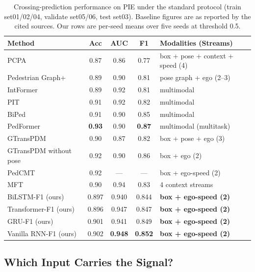 \documentclass[mti,article,submit,moreauthors]{Definitions/mdpi}
\begin{document}
\begin{table}[H]
\caption{Crossing-prediction performance on PIE under the standard protocol (train set01/02/04, validate set05/06, test set03). Baseline figures are as reported by the cited sources. Our rows are per-seed means over five seeds at threshold 0.5.\label{tab:baselines}}
\begin{tabularx}{\textwidth}{lcccX}
\toprule
\textbf{Method} & \textbf{Acc} & \textbf{AUC} & \textbf{F1} & \textbf{Modalities (Streams)}\\
\midrule
PCPA~\citep{kotseruba2021benchmark} & 0.87 & 0.86 & 0.77 & box + pose + context + speed (4)\\
Pedestrian Graph+~\citep{cadena2022pedgraph} & 0.89 & 0.90 & 0.81 & pose graph + ego (2--3)\\
IntFormer~\citep{lorenzo2021intformer} & 0.89 & 0.92 & 0.81 & multimodal\\
PIT~\citep{zhou2023pit} & 0.91 & 0.92 & 0.82 & multimodal\\
BiPed~\citep{rasouli2023pedformer} & 0.91 & 0.90 & 0.85 & multimodal\\
PedFormer~\citep{rasouli2023pedformer} & \textbf{0.93} & 0.90 & \textbf{0.87} & multimodal (multitask)\\
GTransPDM~\citep{xie2025gtranspdm} & 0.90 & 0.87 & 0.82 & box + pose + ego (3)\\
GTransPDM without pose~\citep{xie2025gtranspdm} & 0.92 & 0.90 & 0.86 & box + ego (2)\\
PedCMT~\citep{chen2024pedcmt} & 0.92 & --- & --- & box + ego-speed (2)\\
MFT~\citep{li2025mft} & 0.90 & 0.94 & 0.83 & 4 context streams\\
\midrule
BiLSTM-F1 (ours) & 0.897 & 0.940 & 0.844 & \textbf{box + ego-speed (2)}\\
Transformer-F1 (ours) & 0.896 & 0.947 & 0.847 & \textbf{box + ego-speed (2)}\\
GRU-F1 (ours) & 0.901 & 0.941 & 0.849 & \textbf{box + ego-speed (2)}\\
Vanilla RNN-F1 (ours) & 0.902 & \textbf{0.948} & \textbf{0.852} & \textbf{box + ego-speed (2)}\\
\bottomrule
\end{tabularx}
\end{table}

\subsection{Which Input Carries the Signal?}
\label{sec:ego-ablation}
\end{document}
